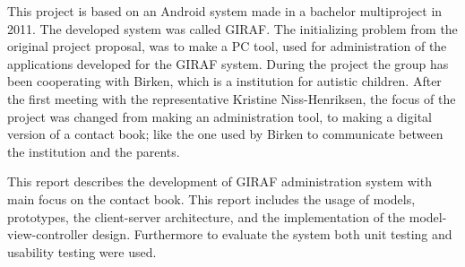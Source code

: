 

This project is based on an Android system made in a bachelor multiproject in 2011. The developed system was called GIRAF. The initializing problem from the original project proposal, was to make a PC tool, used for administration of the applications developed for the GIRAF system. During the project the group has been cooperating with Birken, which is a institution for autistic children. After the first meeting with the representative Kristine Niss-Henriksen, the focus of the project was changed from making an administration tool, to making a digital version of a contact book; like the one used by Birken to communicate between the institution and the parents.

This report describes the development of GIRAF administration system with main focus on the contact book. This report includes the usage of models, prototypes, the client-server architecture, and the implementation of the model-view-controller design. Furthermore to evaluate the system both unit testing and usability testing were used.